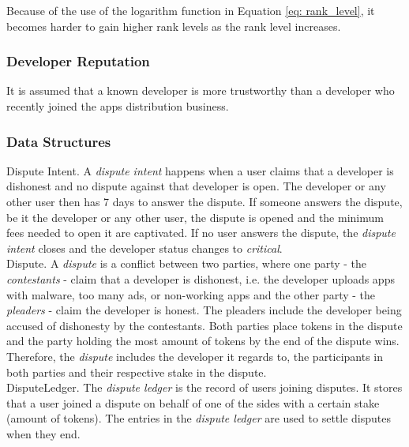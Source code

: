 Because of the use of the logarithm function in Equation \ref{eq: rank_level}, it becomes harder to gain higher rank levels as the rank level increases.

\subsubsection{Developer Reputation}

It is assumed that a known developer is more trustworthy than a developer who recently joined the apps distribution business.

\subsubsection{Data Structures}

\noindent \textsf{Dispute Intent}. A \textit{dispute intent} happens when a user claims that a developer is dishonest and no dispute against that developer is open. The developer or any other user then has 7 days to answer the dispute. If someone answers the dispute, be it the developer or any other user, the dispute is opened and the minimum fees needed to open it are captivated. If no user answers the dispute, the \textit{dispute intent} closes and the developer status changes to \textit{critical}. \\

\noindent \textsf{Dispute}. A \textit{dispute} is a conflict between two parties, where one party - the \textit{contestants} - claim that a developer is dishonest, i.e. the developer uploads apps with malware, too many ads, or non-working apps and the other party - the \textit{pleaders} - claim the developer is honest. The pleaders include the developer being accused of dishonesty by the contestants. Both parties place tokens in the dispute and the party holding the most amount of tokens by the end of the dispute wins. Therefore, the \textit{dispute} includes the developer it regards to, the participants in both parties and their respective stake in the dispute. \\

\noindent \textsf{DisputeLedger}. The \textit{dispute ledger} is the record of users joining disputes. It stores that a user joined a dispute on behalf of one of the sides with a certain stake (amount of tokens). The entries in the \textit{dispute ledger} are used to settle disputes when they end. \\

